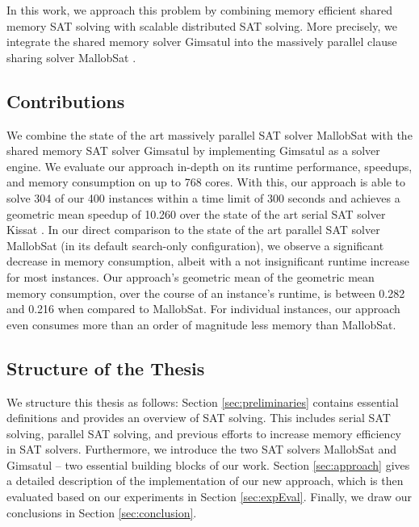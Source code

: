 \documentclass[12pt,a4paper,twoside]{scrartcl}
\numberwithin{equation}{section}
\begin{document}
In this work, we approach this problem by combining memory efficient shared memory SAT solving with scalable distributed SAT solving. More precisely, we integrate the shared memory solver Gimsatul \cite{gimsatul} into the massively parallel clause sharing solver MallobSat \cite{mallobSat}.

\subsection{Contributions}

We combine the state of the art massively parallel SAT solver MallobSat with the shared memory SAT solver Gimsatul by implementing Gimsatul as a solver engine. We evaluate our approach in-depth on its runtime performance, speedups, and memory consumption on up to 768 cores. 
With this, our approach is able to solve 304 of our 400 instances within a time limit of 300 seconds and achieves a geometric mean speedup of 10.260 over the state of the art serial SAT solver Kissat \cite{kissat}. In our direct comparison to the state of the art parallel SAT solver MallobSat (in its default search-only configuration), we observe a significant decrease in memory consumption, albeit with a not insignificant runtime increase for most instances. Our approach's geometric mean of the geometric mean memory consumption, over the course of an instance's runtime, is between 0.282 and 0.216 when compared to MallobSat. For individual instances, our approach even consumes more than an order of magnitude less memory than MallobSat. 

\subsection{Structure of the Thesis}

We structure this thesis as follows: Section \ref{sec:preliminaries} contains essential definitions and provides an overview of SAT solving. This includes serial SAT solving, parallel SAT solving, and previous efforts to increase memory efficiency in SAT solvers. Furthermore, we introduce the two SAT solvers MallobSat \cite{mallobSat} and Gimsatul \cite{gimsatul} -- two essential building blocks of our work.
Section \ref{sec:approach} gives a detailed description of the implementation of our new approach, which is then evaluated based on our experiments in Section \ref{sec:expEval}. Finally, we draw our conclusions in Section \ref{sec:conclusion}.

\end{document}
